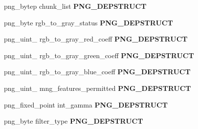 \begin{DoxyCompactItemize}
\item 
png\+\_\+bytep chunk\+\_\+list {\bfseries P\+N\+G\+\_\+\+D\+E\+P\+S\+T\+R\+U\+CT}\hypertarget{structpng__struct__def_ac7a71cbbcb1033ed0aedeab6ca1ab5c7}{}\label{structpng__struct__def_ac7a71cbbcb1033ed0aedeab6ca1ab5c7}

\item 
png\+\_\+byte rgb\+\_\+to\+\_\+gray\+\_\+status {\bfseries P\+N\+G\+\_\+\+D\+E\+P\+S\+T\+R\+U\+CT}\hypertarget{structpng__struct__def_ade2763e7e0af521453f0b0a449be4abb}{}\label{structpng__struct__def_ade2763e7e0af521453f0b0a449be4abb}

\item 
png\+\_\+uint\+\_ rgb\+\_\+to\+\_\+gray\+\_\+red\+\_\+coeff {\bfseries P\+N\+G\+\_\+\+D\+E\+P\+S\+T\+R\+U\+CT}\hypertarget{structpng__struct__def_ad5754034c81fd23959c0265e104306a5}{}\label{structpng__struct__def_ad5754034c81fd23959c0265e104306a5}

\item 
png\+\_\+uint\+\_ rgb\+\_\+to\+\_\+gray\+\_\+green\+\_\+coeff {\bfseries P\+N\+G\+\_\+\+D\+E\+P\+S\+T\+R\+U\+CT}\hypertarget{structpng__struct__def_ab489429099ed66fe88c1c17353787c0c}{}\label{structpng__struct__def_ab489429099ed66fe88c1c17353787c0c}

\item 
png\+\_\+uint\+\_ rgb\+\_\+to\+\_\+gray\+\_\+blue\+\_\+coeff {\bfseries P\+N\+G\+\_\+\+D\+E\+P\+S\+T\+R\+U\+CT}\hypertarget{structpng__struct__def_a1f8930c1eb30f91954fdad638d588682}{}\label{structpng__struct__def_a1f8930c1eb30f91954fdad638d588682}

\item 
png\+\_\+uint\+\_ mng\+\_\+features\+\_\+permitted {\bfseries P\+N\+G\+\_\+\+D\+E\+P\+S\+T\+R\+U\+CT}\hypertarget{structpng__struct__def_a37bd0a51a2f053d223d1a5c2cfad4f29}{}\label{structpng__struct__def_a37bd0a51a2f053d223d1a5c2cfad4f29}

\item 
png\+\_\+fixed\+\_\+point int\+\_\+gamma {\bfseries P\+N\+G\+\_\+\+D\+E\+P\+S\+T\+R\+U\+CT}\hypertarget{structpng__struct__def_afd305e8f99ae00c593b528fef17a27d6}{}\label{structpng__struct__def_afd305e8f99ae00c593b528fef17a27d6}

\item 
png\+\_\+byte filter\+\_\+type {\bfseries P\+N\+G\+\_\+\+D\+E\+P\+S\+T\+R\+U\+CT}\hypertarget{structpng__struct__def_aad67219e17d8f8593d0dd6e31c404c04}{}\label{structpng__struct__def_aad67219e17d8f8593d0dd6e31c404c04}


\end{DoxyCompactItemize}
